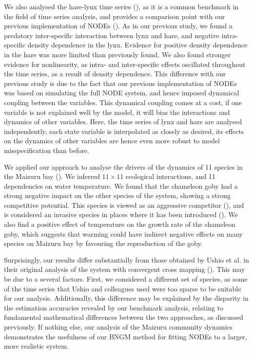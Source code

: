 \documentclass[11pt, oneside]{article}
\begin{document}
We also analysed the hare-lynx time series (\cite{Odum1972}), as it is a common benchmark in the field of time series analysis, and provides a comparison point with our previous implementation of NODEs (\cite{Bonnaffe2021a}).
As in our previous study, we found a predatory inter-specific interaction between lynx and hare, and negative intra-specific density dependence in the lynx.
Evidence for positive density dependence in the hare was more limited than previously found.
We also found stronger evidence for nonlinearity, as intra- and inter-specific effects oscillated throughout the time series, as a result of density dependence.
This difference with our previous study is due to the fact that our previous implementation of NODEs was based on simulating the full NODE system, and hence imposed dynamical coupling between the variables.
This dynamical coupling comes at a cost, if one variable is not explained well by the model, it will bias the interactions and dynamics of other variables.
Here, the time series of lynx and hare are analysed independently, each state variable is interpolated as closely as desired, its effects on the dynamics of other variables are hence even more robust to model misspecification than before.

We applied our approach to analyse the drivers of the dynamics of 11 species in the Maizuru bay (\cite{Ushio2018}).
We inferred $11 \times 11$ ecological interactions, and 11 dependencies on water temperature.
We found that the chameleon goby had a strong negative impact on the other species of the system, showing a strong competitive potential.
This species is viewed as an aggressive competitor (\cite{Ushio2018}), and is considered an invasive species in places where it has been introduced (\cite{Goren2009}).
We also find a positive effect of temperature on the growth rate of the chameleon goby, which suggests that warming could have indirect negative effects on many species on Maizuru bay by favouring the reproduction of the goby.

Surprisingly, our results differ substantially from those obtained by Ushio et al. in their original analysis of the system with convergent cross mapping (\cite{Ushio2018}).
This may be due to a several factors.
First, we considered a different set of species, as some of the time series that Ushio and colleagues used were too sparse to be suitable for our analysis.
Additionally, this difference may be explained by the disparity in the estimation accuracies revealed by our benchmark analysis, relating to fundamental mathematical differences between the two approaches, as discussed previously.
If nothing else, our analysis of the Maizuru community dynamics demonstrates the usefulness of our BNGM method for fitting NODEs to a larger, more realistic system.
\end{document}
